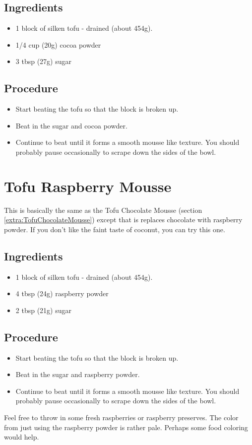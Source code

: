 \documentclass[10pt, openany]{book}
\begin{document}
\subsection{Ingredients}
\begin{itemize}
  \item 1 block of silken tofu - drained (about 454g).
  \item 1/4 cup (20g) cocoa powder
  \item 3 tbsp (27g) sugar
\end{itemize}
\subsection{Procedure}
\begin{itemize}
  \item Start beating the tofu so that the block is broken up.
  \item Beat in the sugar and cocoa powder.
  \item Continue to beat until it forms a smooth mousse like texture.  You should probably pause occasionally to scrape down the sides of the bowl.
\end{itemize}

\section{Tofu Raspberry Mousse}
\label{extra:TofuRaspberryMousse}
This is basically the same as the Tofu Chocolate Mousse (section \ref{extra:TofuChocolateMousse}) except that is replaces chocolate with raspberry powder.  If you don't like the faint taste of coconut, you can try this one.
\subsection{Ingredients}
\begin{itemize}
  \item 1 block of silken tofu - drained (about 454g).
  \item 4 tbsp (24g) raspberry powder
  \item 2 tbsp (21g) sugar
\end{itemize}
\subsection{Procedure}
\begin{itemize}
  \item Start beating the tofu so that the block is broken up.
  \item Beat in the sugar and raspberry powder.
  \item Continue to beat until it forms a smooth mousse like texture.  You should probably pause occasionally to scrape down the sides of the bowl.
\end{itemize}
Feel free to throw in some fresh raspberries or raspberry preserves.  The color from just using the raspberry powder is rather pale.  Perhaps some food coloring would help.
\end{document}
